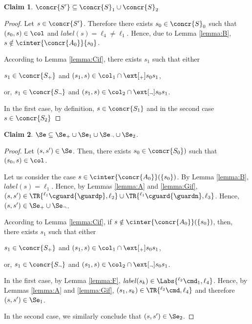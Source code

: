 \documentclass[12pt]{article}
\let\firstunion\cup
\let\firstinter\cap
\let\cup\firstunion
\let\cap\firstinter
\renewcommand{\subset}{\subseteq}
\newcommand{\li}[1]{ {}^{\ell_{#1}}  }
\newcommand{\lbl}{\mathit{label}}
\newtheorem{claim}{Claim}
\begin{document}
\begin{claim}\label{claim:ifS}
 \(\concr{S'}\subset\concr{S}_1\cup\concr{S}_2\)
\end{claim}
\begin{proof}
 Let \(s\in\concr{S'}\). Therefore there exists \(s_0\in\concr{S}_0\) such that \((s_0,s)\in\col\) and \(\lbl(s)=\ell_4\neq\ell_1\). Hence, due to Lemma \ref{lemma:B}, \(s\notin\cinter{\concr{A_0}}\{s_0\}\).
 
 According to Lemma \ref{lemma:Cif}, there exists \(s_1\) such that either \begin{inparaenum}[(1)]\item
 \(s_1\in\concr{S_{{+}}}\) and \((s_1,s)\in\col_{1}\cap\ext[_{{+}}]{s_0}{s_1}\),
 \item or, \(s_1\in\concr{S_{{\neg}}}\) and \((s_1,s)\in\col_{2}\cap\ext[_{{\neg}}]{s_0}{s_1}\).\end{inparaenum}

In the first case, by definition, \(s\in\concr{S_1}\) and in the second case \(s\in\concr{S_2}\)
\end{proof}

\begin{claim}\label{claim:ifSe}\(\Se\subset\Se_{{+}}\cup\Se_1\cup\Se_{{\neg}}\cup\Se_2\).
\end{claim}
\begin{proof}
 Let \((s,s') \in \Se \).
 Then, there exists \(s_0\in\concr{S_0})\) such that \((s_0,s)\in\col\).
 
 Let us consider the case \(s\in\cinter{\concr{A_0}}(\{s_0\})\). By Lemma \ref{lemma:B}, \(\lbl(s)=\ell_1\).
 Hence, by Lemmas \ref{lemma:A} and \ref{lemma:Gif}, \((s,s') \in \TR{\li1 \cguard{\guardp},\ell_2}\cup\TR{\li1 \cguard{\guardn},\ell_3}\).
 Hence, \((s,s')\in \Se_{{+}}\cup\Se_{{\neg}}\).
 
 According to Lemma \ref{lemma:Cif}, if \(s\notin\cinter{\concr{A_0}}(\{s_0\})\), then, there exists \(s_1\) such that either \begin{inparaenum}[(1)]\item
 \(s_1\in\concr{S_{{+}}}\) and \((s_1,s)\in\col_{1}\cap\ext[_{{+}}]{s_0}{s_1}\),
 \item or, \(s_1\in\concr{S_{{\neg}}}\) and \((s_1,s)\in\col_{2}\cap\ext[_{{\neg}}]{s_0}{s_1}\).\end{inparaenum}
 
 In the first case, by Lemma \ref{lemma:F}, \(\lbl(s_k)\in\Labs{\li2\cmd_1,\ell_4}\). Hence, by Lemmas \ref{lemma:A} and \ref{lemma:Gif}, \((s_1,s_k)\in\TR{\li2\cmd,\ell_4}\) and therefore \((s,s')\in\Se_1\).
 
In the second case, we similarly conclude that  \((s,s')\in\Se_2\).
\end{proof}
\end{document}
